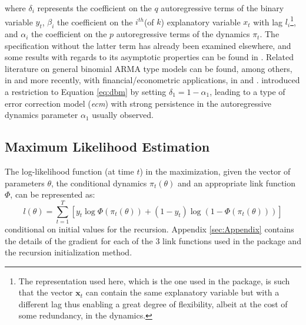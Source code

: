where $\delta_i$ represents the coefficient on the $q$ autoregressive terms of the binary variable $y_t$, $\beta_i$ the coefficient on the $i^{th}$(of $k$) explanatory variable $x_t$ with lag $l_i$\footnote{The representation used here, which is the one used in the package, is such that the vector $\mathbf{x}_t$ can contain the same explanatory variable but with a different lag thus enabling a great degree of flexibility, albeit at the cost of some redundancy, in the dynamics.}, and $\alpha_i$ the coefficient on the $p$ autoregressive terms of the dynamics $\pi_t$. The specification without the latter term has already been examined elsewhere, and some results with regards to its asymptotic properties can be found in \cite{Jong2011}.  Related literature on general binomial ARMA type models can be found, among others, in \cite{Al-Osh1991} and more recently, with financial/econometric applications, in \cite{Rydberg2003} and \cite{Startz2008}. \cite{Nyberg2011} introduced a restriction to Equation \ref{eq:dbm} by setting $\delta_1=1-\alpha_1$, leading to a type of error correction model (\emph{ecm}) with strong persistence in the autoregressive dynamics parameter $\alpha_1$ usually observed.\\
\subsection{Maximum Likelihood Estimation}
The log-likelihood function (at time $t$) in the maximization, given the vector of parameters $\theta$, the conditional dynamics ${\pi _t}\left( \theta  \right)$ and an appropriate link function $\Phi$, can be represented as:
\begin{equation}
l\left( \theta  \right) = \sum\limits_{t = 1}^T {\left[ {{y_t}\log \Phi \left( {{\pi _t}\left( \theta  \right)} \right) + \left( {1 - {y_t}} \right)\log \left( {1 - \Phi \left( {{\pi _t}\left( \theta  \right)} \right)} \right)} \right]}
\end{equation}
conditional on initial values for the recursion. Appendix \ref{sec:Appendix} contains the details of the gradient for each of the 3 link functions used in the \verb@dbm@ package and the recursion initialization method.\\
